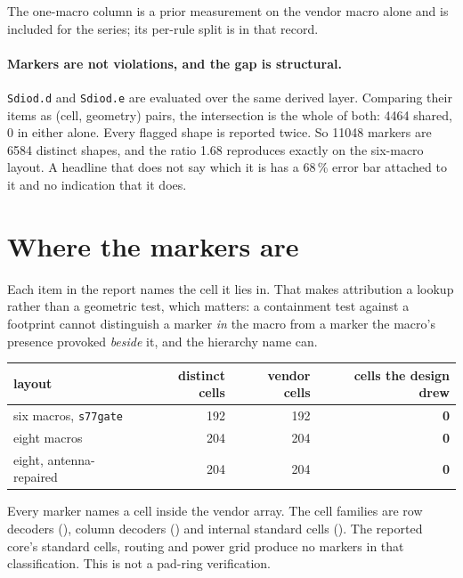 \documentclass[11pt,a4paper]{article}
\newcommand{\file}[1]{\texttt{\small #1}}
\begin{document}
The one-macro column is a prior measurement on the vendor macro alone and
is included for the series; its per-rule split is in that record.

\paragraph{Markers are not violations, and the gap is structural.}
\texttt{Sdiod.d} and \texttt{Sdiod.e} are evaluated over the same derived
layer. Comparing their items as (cell, geometry) pairs, the intersection
is the whole of both: \num{4464} shared, \num{0} in either alone. Every
flagged shape is reported twice. So \num{11048} markers are \num{6584}
distinct shapes, and the ratio \num{1.68} reproduces exactly on the
six-macro layout. A headline that does not say which it is has a
\num{68}\,\% error bar attached to it and no indication that it does.

\section{Where the markers are}
\label{sec:attribution}

Each item in the report names the cell it lies in. That makes
attribution a lookup rather than a geometric test, which matters: a
containment test against a footprint cannot distinguish a marker
\emph{in} the macro from a marker the macro's presence provoked
\emph{beside} it, and the hierarchy name can.

\begin{center}
\begin{tabular}{lrrr}
\toprule
layout & distinct cells & vendor cells & \textbf{cells the design drew} \\
\midrule
six macros, \file{s77gate}   & \num{192} & \num{192} & \textbf{0} \\
eight macros                 & \num{204} & \num{204} & \textbf{0} \\
eight, antenna-repaired      & \num{204} & \num{204} & \textbf{0} \\
\bottomrule
\end{tabular}
\end{center}

Every marker names a cell inside the vendor array. The cell families are
row decoders ({\small{}}), column decoders
({\small{}}) and internal standard cells
({\small{}}). The
reported core's standard cells, routing and power grid produce no
markers in that classification. This is not a pad-ring verification.
\end{document}

